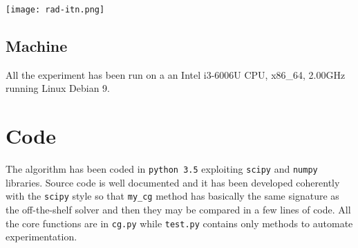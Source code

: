 \documentclass[12pt]{article}
\newcommand{\1}{\mathbbm{1}}
\begin{document}
\begin{center}
\texttt{[image: rad-itn.png]}
\end{center}

\subsection{Machine}
All the experiment has been run on a an Intel i3-6006U CPU, x86\_64, 2.00GHz running Linux Debian 9.

\section{Code}
The algorithm has been coded in \texttt{python 3.5} exploiting \texttt{scipy} and \texttt{numpy} libraries. Source code is well documented and it has been developed coherently with the \texttt{scipy} style so that \texttt{my\_cg} method has basically the same signature as the off-the-shelf solver and then they may be compared in a few lines of code. All the core functions are in \texttt{cg.py} while \texttt{test.py} contains only methods to automate experimentation.
  
  

\end{document}
